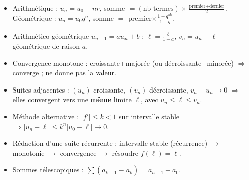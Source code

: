 \documentclass[11pt,a4paper]{article}
\begin{document}
\vspace{4mm}
\begin{tcolorbox}[
  enhanced, boxrule=0pt, arc=2mm,
  interior style={left color=qtealdark, right color=qteal},
  left=6mm, right=6mm, top=4mm, bottom=4mm,
  fontupper=\color{white}\sffamily,
  title={\sffamily\bfseries\color{white}\ding{72}~~À retenir},
  colbacktitle=qtealdark, coltitle=white, boxrule=0pt
]
\begin{itemize}[leftmargin=6mm, label={\color{qamber}}, itemsep=1mm]
  \item Arithmétique : $u_n=u_0+nr$, somme $=(\text{nb termes})\times\frac{\text{premier}+\text{dernier}}{2}$. Géométrique : $u_n=u_0q^n$, somme $=$ premier$\times\frac{1-q^{\text{nb}}}{1-q}$.
  \item Arithmético-géométrique $u_{n+1}=au_n+b$ : $\ell=\frac{b}{1-a}$, $v_n=u_n-\ell$ géométrique de raison $a$.
  \item Convergence monotone : croissante+majorée (ou décroissante+minorée) $\Rightarrow$ converge ; ne donne pas la valeur.
  \item Suites adjacentes : $(u_n)$ croissante, $(v_n)$ décroissante, $v_n-u_n\to0$ $\Rightarrow$ elles convergent vers une \textbf{même} limite $\ell$, avec $u_n\leq\ell\leq v_n$.
  \item Méthode alternative : $|f'|\leq k<1$ sur intervalle stable $\Rightarrow |u_n-\ell|\leq k^n|u_0-\ell|\to 0$.
  \item Rédaction d'une suite récurrente : intervalle stable (récurrence) $\to$ monotonie $\to$ convergence $\to$ résoudre $f(\ell)=\ell$.
  \item Sommes télescopiques : $\sum(a_{k+1}-a_k) = a_{n+1}-a_0$.
\end{itemize}
\end{tcolorbox}
\end{document}
